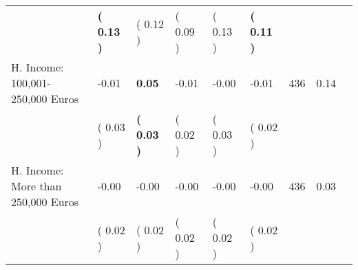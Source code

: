 \begin{tabular}{L{6.2cm} C{1.8cm} C{1.8cm} C{1.8cm} C{1.8cm} C{1.8cm} C{1.8cm} C{0.3cm} C{0.3cm}}
 & \textbf{(     0.13 )} & (     0.12 ) & (     0.09 ) & (     0.13 ) & \textbf{(     0.11 )}  & \\
H. Income: 100,001-250,000 Euros &     -0.01 & \textbf{     0.05} &     -0.01 &     -0.00 &     -0.01  & 436 &       0.14 \\ 
 & (     0.03 ) & \textbf{(     0.03 )} & (     0.02 ) & (     0.03 ) & (     0.02 )  & \\
H. Income: More than 250,000 Euros &     -0.00 &     -0.00 &     -0.00 &     -0.00 &     -0.00  & 436 &       0.03 \\ 
 & (     0.02 ) & (     0.02 ) & (     0.02 ) & (     0.02 ) & (     0.02 )  & \\
\bottomrule
\end{tabular}
